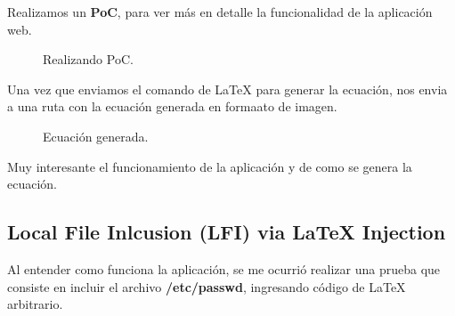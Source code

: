 \documentclass[a4paper]{article} %
\begin{document}
\vspace{5cm}

Realizamos un \textbf{PoC}, para ver más en detalle la funcionalidad de la aplicación web.

\begin{figure}[h] %
    \begin{center}
    \setlength{\fboxsep}{0.2em} %
    \end{center}
    \captionsetup{labelfont=bf} %
    \caption{Realizando PoC.}
\end{figure}

\vspace{6cm}

Una vez que enviamos el comando de LaTeX para generar la ecuación, nos envia a una ruta con la ecuación generada en formaato de imagen.

\begin{figure}[h] %
    \begin{center}
    \setlength{\fboxsep}{0.2em} %
    \end{center}
    \captionsetup{labelfont=bf} %
    \caption{Ecuación generada.}
\end{figure}

Muy interesante el funcionamiento de la aplicación y de como se genera la ecuación.\par

\vspace{8cm}

    \subsection{Local File Inlcusion (LFI) via LaTeX Injection}

    \vspace{0.2cm}
    
    Al entender como funciona la aplicación, se me ocurrió realizar una prueba que consiste en incluir el archivo \textbf{/etc/passwd}, ingresando código de LaTeX arbitrario.\par
\end{document}
